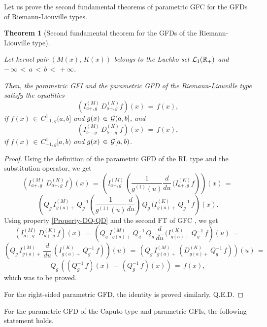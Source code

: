 \documentclass[12pt]{article}
\newtheorem{Theorem}{Theorem}
\begin{document}


Let us prove the second fundamental theorems of parametric GFC for the GFDs of Riemann-Liouville types.

\begin{Theorem}[Second fundamental theorem for the GFDs of the Riemann-Liouville type]
\label{FT-2-RL} 

Let kernel pair $(M(x), \, K(x))$ belongs to the Luchko set ${\cal L}_{1}(\mathbb{R}_{+})$ and 
$ - \, \infty \, < \, a \, < \, b \, < \, +\infty$. 

Then, the parametric GFI and the parametric GFD of the Riemann-Liouville type satisfy the equalities
\[
(I^{(M)}_{a+,g} \, D^{(K)}_{a+,g} f)(x) \, = \, f(x) ,
\]
if $f(x) \, \in \, C^{1}_{-1,g}(a,b]$ 
and $g(x) \, \in \, {\cal G}(a,b]$, and 
\[
(I^{(M)}_{b-,g} \, D^{(K)}_{b-,g} f)(x) \, = \, f(x) ,
\]
if $f(x) \, \in \, C^{1}_{-1,g}[a,b)$ 
and $g(x) \, \in \, {\cal G}[a,b)$.
\end{Theorem}

\begin{proof}
Using the definition of the parametric GFD of the RL type and the substitution operator, we get
\[
(I^{(M)}_{a+,g} \, D^{(K)}_{a+,g} f)(x) \, = \, 
\left(I^{(M)}_{a+,g} \, \left(\frac{1}{g^{(1)}(u)} \frac{d}{du} \, (I^{(K)}_{a+,g} f \right) \right)(x) \, = \, 
\]
\[
\left(Q_g \, I^{(M)}_{g(a)+} \, Q^{-1}_g 
\left(\frac{1}{g^{(1)}(u)} \frac{d}{du} \right) \, 
Q_g \, (I^{(K)}_{g(a)+} \, Q^{-1}_g \, f \right)(x) . 
\]
Using property \eqref{Property-DQ-QD} and the second FT of GFC \cite{Luchko2023}, we get
\[
(I^{(M)}_{a+,g} \, D^{(K)}_{a+,g} f)(x) \, = \, 
\left(Q_g \, I^{(M)}_{g(a)+} \, Q^{-1}_g \, 
Q_g \, \frac{d}{du} \, (I^{(K)}_{g(a)+} \, Q^{-1}_g \, f \right)(u) \, = \, 
\]
\[
\left(Q_g \, I^{(M)}_{g(a)+} \, \frac{d}{du} \, 
\left(I^{(K)}_{g(a)+} \, Q^{-1}_g \, f \right) \right)(u) 
\, = \, 
\left(Q_g \, I^{(M)}_{g(a)+} \, 
\left( D^{(K)}_{g(a)+} \, Q^{-1}_g \, f \right) \right) (u) 
\, = \, 
\]
\[
Q_g \, \left( (Q^{-1}_g \, f)(x) \, - \, 
(Q^{-1}_g \, f)(x) \right) \, = \, f(x) ,
\]
which was to be proved. 

For the right-sided parametric GFD, the identity is proved similarly.
Q.E.D.
\end{proof}

For the parametric GFD of the Caputo type and parametric GFIs, 
the following statement holds.
\end{document}
